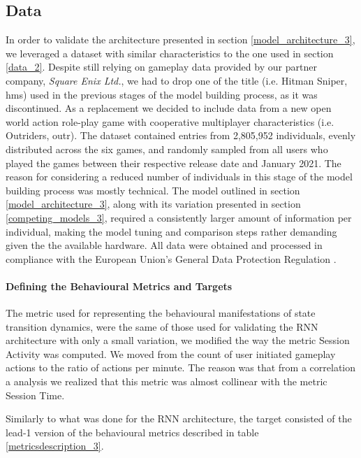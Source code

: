 \subsection{Data}
\label{data_3}
In order to validate the architecture presented in section \ref{model_architecture_3}, we leveraged a dataset with similar characteristics to the one used in section \ref{data_2}. Despite still relying on gameplay data provided by our partner company, \textit{Square Enix Ltd.}, we had to drop one of the title (i.e. Hitman Sniper, hms) used in the previous stages of the model building process, as it was discontinued. As a replacement we decided to include data from a new open world action role-play game with cooperative multiplayer characteristics (i.e. Outriders, outr). The dataset contained entries from 2,805,952 individuals, evenly distributed across the six games, and randomly sampled from all users who played the games between their respective release date and January 2021. The reason for considering a reduced number of individuals in this stage of the model building process was mostly technical. The model outlined in section \ref{model_architecture_3}, along with its variation presented in section \ref{competing_models_3}, required a consistently larger amount of information per individual, making the model tuning and comparison steps rather demanding given the the available hardware. All data were obtained and processed in compliance with the European Union's General Data Protection Regulation \cite{EUdataregulations2018}. 


\paragraph*{Defining the Behavioural Metrics and Targets}
The metric used for representing the behavioural manifestations of state transition dynamics, were the same 
of those used for validating the RNN architecture with only a small variation,  we modified the way the metric Session Activity was computed. We moved from the count of user initiated gameplay actions to the ratio of actions per minute. The reason was that from a correlation a analysis we realized that this metric was almost collinear with the metric Session Time.

Similarly to what was done for the RNN architecture, the target consisted of the lead-1 version of the behavioural metrics described in table \ref{metricsdescription_3}.

